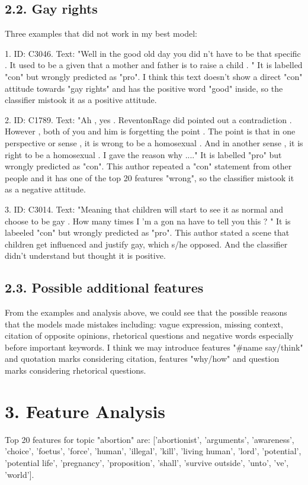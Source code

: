 \documentclass{article}
\begin{document}
\subsection*{2.2. Gay rights}
Three examples that did not work in my best model:

1. ID: C3046. Text: "Well in the good old day you did n't have to be that specific . It used to be a given that a mother and father is to raise a child . " It is labelled "con" but wrongly predicted as "pro". I think this text doesn't show a direct "con" attitude towards "gay rights" and has the positive word "good" inside, so the classifier mistook it as a positive attitude.

2. ID: C1789. Text: "Ah , yes . ReventonRage did pointed out a contradiction . However , both of you and him is forgetting the point . The point is that in one perspective or sense , it is wrong to be a homosexual . And in another sense , it is right to be a homosexual . I gave the reason why ...." It is labelled "pro" but wrongly predicted as "con". This author repeated a "con" statement from other people and it has one of the top 20 features "wrong", so the classifier mistook it as a negative attitude.

3. ID: C3014. Text: "Meaning that children will start to see it as normal and choose to be gay . How many times I 'm a gon na have to tell you this ? " It is labeeled "con" but wrongly predicted as "pro". This author stated a scene that children get influenced and justify gay, which s/he opposed. And the classifier didn't understand but thought it is positive.

\subsection*{2.3. Possible additional features}
From the examples and analysis above, we could see that the possible reasons that the models made mistakes including: vague expression, missing context, citation of opposite opinions, rhetorical questions and negative words especially before important keywords. I think we may introduce features "\#name say/think" and quotation marks considering citation, features "why/how" and question marks considering rhetorical questions. 

\section*{3. Feature Analysis}
Top 20 features for topic "abortion" are: ['abortionist', 'arguments', 'awareness', 'choice', 'foetus', 'force', 'human', 'illegal', 'kill', 'living human', 'lord', 'potential', 'potential life', 'pregnancy', 'proposition', 'shall', 'survive outside', 'unto', 've', 'world'].
\end{document}
